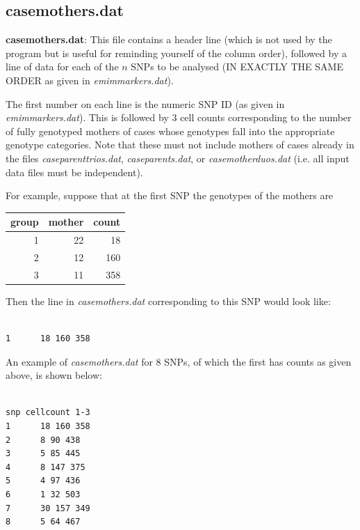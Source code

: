 \documentclass[a4paper,12pt]{article}
\begin{document}
\subsection{casemothers.dat}
\label{casemothers}

{\bf casemothers.dat}: This file contains a header line (which is not used by the program but is useful for reminding yourself of the column order), followed by a line of data for each of the $n$ SNPs to be analysed (IN EXACTLY THE SAME ORDER as given in {\it emimmarkers.dat}). 

The first number on each line is the numeric SNP ID (as given in {\it emimmarkers.dat}). This is followed by 3 cell counts corresponding to the number of fully genotyped mothers of cases whose genotypes fall into the appropriate genotype categories. Note that these must not include mothers of cases already in the files {\it caseparenttrios.dat}, {\it caseparents.dat}, or {\it casemotherduos.dat} (i.e. all input data files must be independent). 

For example, suppose that at the first SNP the genotypes of the mothers are 

{\begin{center}\begin{tabular}{rrr}
group  & mother  & count\\
\hline
1  & 22  & 18\\
2  & 12  & 160\\
3  & 11  & 358\\
\end{tabular}\end{center}}

Then the line in {\it casemothers.dat} corresponding to this SNP would look like: 
\vspace{0.35cm} \begin{lstlisting}

1      18 160 358

\end{lstlisting} \vspace{0.35cm}
An example of {\it casemothers.dat} for 8 SNPs, of which the first has counts as given above, is shown below: 
\vspace{0.35cm} \begin{lstlisting}

snp cellcount 1-3
1      18 160 358
2      8 90 438
3      5 85 445
4      8 147 375
5      4 97 436
6      1 32 503
7      30 157 349
8      5 64 467

\end{lstlisting} \vspace{0.35cm}
\end{document}
